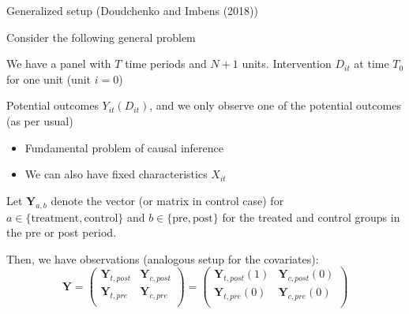 \documentclass[notes,11pt, aspectratio=169]{beamer}
\newenvironment{wideitemize}{\itemize\addtolength{\itemsep}{10pt}}{\enditemize}
\begin{document}
\begin{frame}{Generalized setup (Doudchenko and Imbens (2018))}
  \begin{wideitemize}
  \item Consider the following general problem
    \item We have a panel with $T$ time periods and $N+1$
      units. Intervention $D_{it}$ at time $T_{0}$ for one unit (unit $i = 0$)
    \item Potential outcomes $Y_{it}(D_{it})$, and we only observe one
      of the potential outcomes (as per usual)
      \begin{itemize}
      \item Fundamental problem of causal inference
      \item We can also have fixed characteristics $X_{it}$
      \end{itemize}
    \item Let $\mathbf{Y}_{a,b}$ denote the vector (or matrix in
      control case) for $a \in \{\text{treatment}, \text{control}\}$ and
      $b \in \{\text{pre}, \text{post}\}$ for the treated and control
      groups in the pre or post period.
    \item Then, we have observations (analogous setup for the covariates):
      \begin{equation*}
        \mathbf{Y} = \left( \begin{array}{cc}
                              \mathbf{Y}_{t,post} & \mathbf{Y}_{c,post} \\
                              \mathbf{Y}_{t,pre} & \mathbf{Y}_{c,pre} \\
                            \end{array}
                            \right) =  \left( \begin{array}{cc}
                              \mathbf{Y}_{t,post}(1) & \mathbf{Y}_{c,post}(0) \\
                              \mathbf{Y}_{t,pre}(0) & \mathbf{Y}_{c,pre}(0) \\
                            \end{array}
                            \right) 
      \end{equation*}
  \end{wideitemize}
\end{frame}
\end{document}
